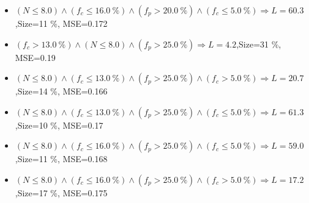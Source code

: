 \documentclass[numbered]{CSL}
\begin{document}
\begin{itemize}
\item $(N \leq 8.0) \land (f_c \leq 16.0~\%) \land (f_p > 20.0~\%) \land (f_c \leq 5.0~\%) \Rightarrow L = 60.3$,\hfill Size=11 \%, MSE=0.172
\item $(f_c > 13.0~\%) \land (N \leq 8.0) \land (f_p > 25.0~\%) \Rightarrow L = 4.2$,\hfill Size=31 \%, MSE=0.19
\item $(N \leq 8.0) \land (f_c \leq 13.0~\%) \land (f_p > 25.0~\%) \land (f_c > 5.0~\%) \Rightarrow L = 20.7$,\hfill Size=14 \%, MSE=0.166
\item $(N \leq 8.0) \land (f_c \leq 13.0~\%) \land (f_p > 25.0~\%) \land (f_c \leq 5.0~\%) \Rightarrow L = 61.3$,\hfill Size=10 \%, MSE=0.17
\item $(N \leq 8.0) \land (f_c \leq 16.0~\%) \land (f_p > 25.0~\%) \land (f_c \leq 5.0~\%) \Rightarrow L = 59.0$,\hfill Size=11 \%, MSE=0.168
\item $(N \leq 8.0) \land (f_c \leq 16.0~\%) \land (f_p > 25.0~\%) \land (f_c > 5.0~\%) \Rightarrow L = 17.2$,\hfill Size=17 \%, MSE=0.175
\end{itemize}
\end{document}
